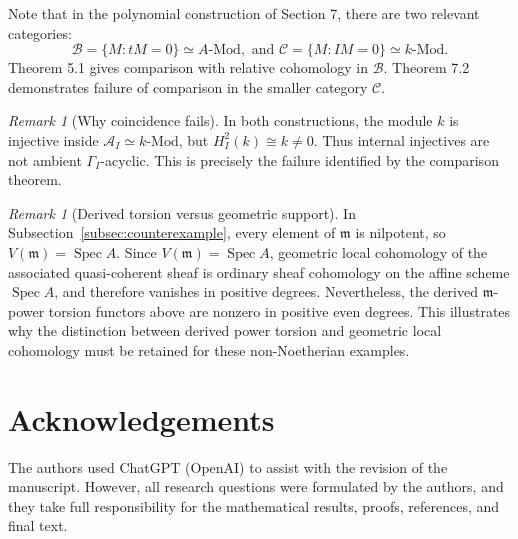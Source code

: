 \documentclass[11pt,reqno]{amsart}
\theoremstyle{definition}
\theoremstyle{remark}
\newtheorem{remark}[theorem]{Remark}
\newcommand{\Mod}{\text{-}\mathrm{Mod}}
\newcommand{\Spec}{\operatorname{Spec}}
\newcommand{\A}{\mathcal A_I}
\begin{document}
Note that in the polynomial construction of Section 7, there are two relevant categories:
\[
\mathcal B=\{M:tM=0\}\simeq A\text{-}\mathrm{Mod},
\text{ and }
\mathcal C=\{M:IM=0\}\simeq k\text{-}\mathrm{Mod}.
\]
Theorem 5.1 gives comparison with relative cohomology in \(\mathcal B\). Theorem 7.2 demonstrates failure of comparison in the smaller category \(\mathcal C\).

\begin{remark}[Why coincidence fails]
In both constructions, the module $k$ is injective
inside $\A\simeq k\Mod$, but \(H_I^2(k)\cong k\neq 0.\)
Thus internal injectives are not ambient
$\Gamma_I$-acyclic. This is precisely the failure
identified by the comparison theorem.
\end{remark}

\begin{remark}[Derived torsion versus geometric support]
In Subsection~\ref{subsec:counterexample}, every element of $\mathfrak m$ is
nilpotent, so \(V(\mathfrak m)=\Spec A.\)
Since \(V(\mathfrak m)=\operatorname{Spec}A\), geometric local cohomology of the associated quasi-coherent sheaf is ordinary sheaf cohomology on the affine scheme \(\operatorname{Spec}A\), and therefore vanishes in positive degrees. Nevertheless,
the derived $\mathfrak m$-power torsion functors above
are nonzero in positive even degrees. This illustrates why the distinction between derived
power torsion and geometric local cohomology must be
retained for these non-Noetherian examples.
\end{remark}

\section*{Acknowledgements}
The authors used ChatGPT (OpenAI) to assist with the revision of the manuscript. However, all research questions were formulated by the
authors, and they take full responsibility for
the mathematical results, proofs, references, and final text.
\end{document}
